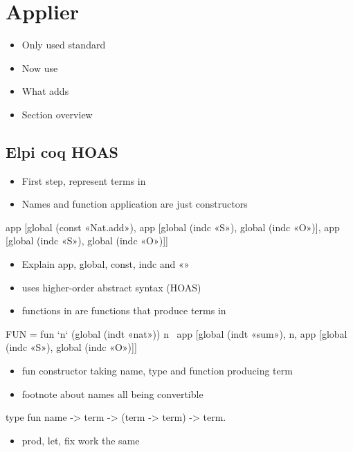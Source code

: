 \documentclass[thesis.tex]{subfiles}
\begin{document}
{{\section{Applier}\label{ssec:applier}
  \begin{itemize}
    \item Only used standard \elpi
    \item Now use \ce
    \item What \ce adds
    \item Section overview
  \end{itemize}


\subsection{Elpi coq HOAS}
  \begin{itemize}
    \item First step, represent \coq terms in \elpi
    \item Names and function application are just constructors
  \end{itemize}
  \begin{elpicode}
  app [global (const «Nat.add»), 
      app [global (indc «S»), global (indc «O»)], 
      app [global (indc «S»), global (indc «O»)]]
\end{elpicode}
  \begin{itemize}
    \item Explain app, global, const, indc and «»
  \end{itemize}

  \begin{itemize}
    \item \ce uses higher-order abstract syntax (HOAS)
    \item functions in \coq are functions that produce terms in \ce
  \end{itemize}
  \begin{elpicode}
  FUN = fun `n` (global (indt «nat»)) n \ 
          app [global (indt «sum»), 
              n, 
              app [global (indc «S»), global (indc «O»)]]
\end{elpicode}
  \begin{itemize}
    \item fun constructor taking name, type and function producing term
    \item footnote about names all being convertible
  \end{itemize}
  \begin{elpicode}
  type fun  name -> term -> (term -> term) -> term.
\end{elpicode}
  \begin{itemize}
    \item prod, let, fix work the same
  \end{itemize}


}}
\end{document}
